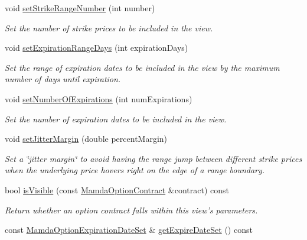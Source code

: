 \begin{CompactItemize}
void \hyperlink{classWombat_1_1MamdaOptionChainView_3c81aaafb26be5be4817009bc766b688}{set\-Strike\-Range\-Number} (int number)
\begin{CompactList}\small\item\em Set the number of strike prices to be included in the view. \item\end{CompactList}\item 
void \hyperlink{classWombat_1_1MamdaOptionChainView_2d8ab089e9fb64bed9a8a3be612ac618}{set\-Expiration\-Range\-Days} (int expiration\-Days)
\begin{CompactList}\small\item\em Set the range of expiration dates to be included in the view by the maximum number of days until expiration. \item\end{CompactList}\item 
void \hyperlink{classWombat_1_1MamdaOptionChainView_0fb174b905a2babf5fd0b92fb5a69650}{set\-Number\-Of\-Expirations} (int num\-Expirations)
\begin{CompactList}\small\item\em Set the number of expiration dates to be included in the view. \item\end{CompactList}\item 
void \hyperlink{classWombat_1_1MamdaOptionChainView_37549b6a122846ba40e229057f254e84}{set\-Jitter\-Margin} (double percent\-Margin)
\begin{CompactList}\small\item\em Set a \char`\"{}jitter margin\char`\"{} to avoid having the range jump between different strike prices when the underlying price hovers right on the edge of a range boundary. \item\end{CompactList}\item 
bool \hyperlink{classWombat_1_1MamdaOptionChainView_75400cd672fc2befd3d1525d2bf1d4ce}{is\-Visible} (const \hyperlink{classWombat_1_1MamdaOptionContract}{Mamda\-Option\-Contract} \&contract) const 
\begin{CompactList}\small\item\em Return whether an option contract falls within this view's parameters. \item\end{CompactList}\item 
const \hyperlink{classWombat_1_1MamdaOptionExpirationDateSet}{Mamda\-Option\-Expiration\-Date\-Set} \& \hyperlink{classWombat_1_1MamdaOptionChainView_a177b7d79939b2e73baca1c04c8fba61}{get\-Expire\-Date\-Set} () const 

\end{CompactItemize}
